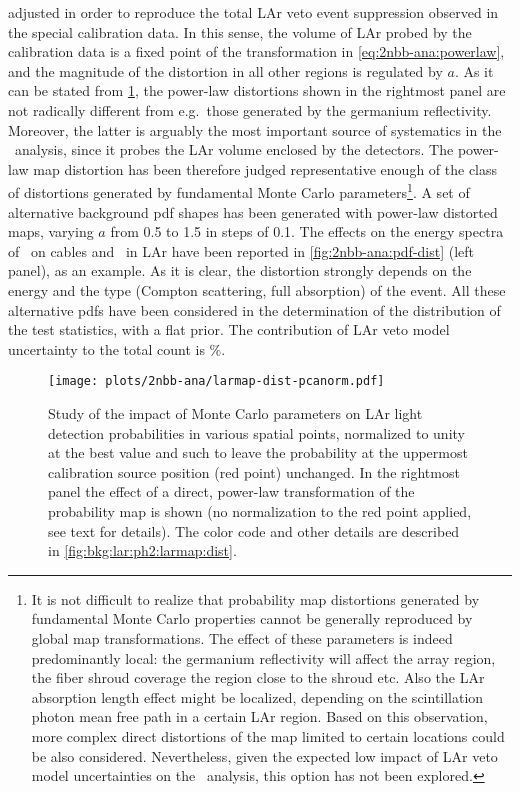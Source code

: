 \begin{description}
    adjusted in order to reproduce the total LAr veto event suppression observed in the
    special calibration data. In this sense, the volume of LAr probed by the calibration
    data is a fixed point of the transformation in \cref{eq:2nbb-ana:powerlaw}, and the
    magnitude of the distortion in all other regions is regulated by $a$.
    \newpar
    As it can be stated from \cref{fig:2nbb-ana:dist-pcanorm}, the power-law distortions
    shown in the rightmost panel are not radically different from e.g.~those generated by
    the germanium reflectivity. Moreover, the latter is arguably the most important source
    of systematics in the \nnbb\ analysis, since it probes the LAr volume enclosed by the
    detectors. The power-law map distortion has been therefore judged representative
    enough of the class of distortions generated by fundamental Monte Carlo
    parameters\footnote{%
      It is not difficult to realize that probability map distortions generated by
      fundamental Monte Carlo properties cannot be generally reproduced by global map
      transformations. The effect of these parameters is indeed predominantly local: the
      germanium reflectivity will affect the array region, the fiber shroud coverage the
      region close to the shroud etc. Also the LAr absorption length effect might be
      localized, depending on the scintillation photon mean free path in a certain LAr
      region.  Based on this observation, more complex direct distortions of the map
      limited to certain locations could be also considered. Nevertheless, given the
      expected low impact of LAr veto model uncertainties on the \nnbb\ analysis, this
      option has not been explored.
    }.
    \newpar
    A set of alternative background pdf shapes has been generated with power-law distorted
    maps, varying $a$ from 0.5 to 1.5 in steps of 0.1. The effects on the energy
    spectra of \kvn\ on cables and \kvz\ in LAr have been reported in
    \cref{fig:2nbb-ana:pdf-dist} (left panel), as an example. As it is clear, the
    distortion strongly depends on the energy and the type (Compton scattering, full
    absorption) of the event. All these alternative pdfs have been considered in the
    determination of the distribution of the test statistics, with a flat prior. The
    contribution of LAr veto model uncertainty to the total count is \%.

    \begin{figure}
      \centering
      \texttt{[image: plots/2nbb-ana/larmap-dist-pcanorm.pdf]}
      \caption{%
        Study of the impact of Monte Carlo parameters on LAr light detection probabilities in
        various spatial points, normalized to unity at the best value and such to leave the
        probability at the uppermost calibration source position (red point) unchanged. In
        the rightmost panel the effect of a direct, power-law transformation of the
        probability map is shown (no normalization to the red point applied, see text for
        details). The color code and other details are described in
        \cref{fig:bkg:lar:ph2:larmap:dist}.
      }\label{fig:2nbb-ana:dist-pcanorm}
    \end{figure}


\end{description}
